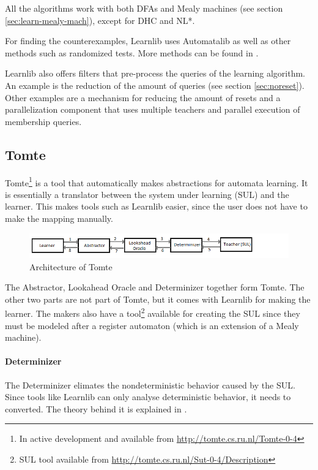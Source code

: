 \documentclass[multi,crop=false,class=article]{standalone}
\begin{document}
All the algorithms work with both DFAs and Mealy machines (see section
\ref{sec:learn-mealy-mach}), except for DHC\cite{Merten2012} and
NL*\cite{Bollig2009}.

For finding the counterexamples, Learnlib uses Automatalib as well as other
methods such as randomized tests. More methods can be found in
\cite[p. 490]{Isberner2015b}.

Learnlib also offers filters that pre-process the queries of the learning
algorithm. An example is the reduction of the amount of queries (see section
\ref{sec:noreset}). Other examples are a mechanism for reducing the amount of
resets and a parallelization component that uses multiple teachers and
parallel execution of membership queries\cite{Henrix2015,Howar2012}.


\subsection{Tomte}
\label{ssec:tomte}
Tomte\footnote{In active development and available from
\url{http://tomte.cs.ru.nl/Tomte-0-4}} is a tool that automatically makes
abstractions for automata learning. It is essentially a translator between the
system under learning (SUL) and the learner. This makes tools such as Learnlib
easier, since the user does not have to make the mapping manually.

\begin{figure}[!ht]
	\includegraphics[width=\textwidth]{Tool_images/tomte_network.png}
	\caption{Architecture of Tomte}
	\label{fig:tomte_arch_interaction}
\end{figure}

The Abstractor, Lookahead Oracle and Determinizer together form Tomte. The
other two parts are not part of Tomte, but it comes with Learnlib for making
the learner. The makers also have a tool\footnote{SUL tool available from
\url{http://tomte.cs.ru.nl/Sut-0-4/Description}} available for creating the SUL
since they must be modeled after a register automaton\cite{Aarts2015}
(which is an extension of a Mealy machine).

\paragraph{Determinizer} The Determinizer elimates the nondeterministic
behavior caused by the SUL. Since tools like Learnlib can only analyse
deterministic behavior, it needs to converted. The theory behind it is
explained in \cite[p. 172]{Aarts2015}.
\end{document}
